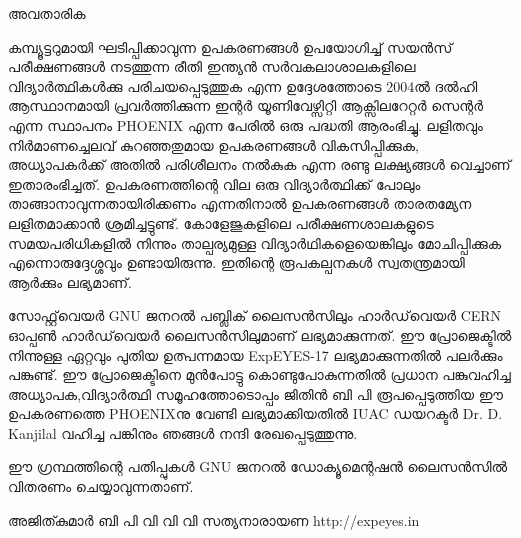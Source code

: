 \documentclass[12pt,a4paper]{report}
\begin{document}
\thispagestyle{empty}


അവതാരിക 

കമ്പ്യൂട്ടറുമായി ഘടിപ്പിക്കാവുന്ന ഉപകരണങ്ങൾ ഉപയോഗിച്ച് സയൻസ് പരീക്ഷണങ്ങൾ നടത്തുന്ന രീതി ഇന്ത്യൻ സർവകലാശാലകളിലെ വിദ്യാർത്ഥികൾക്കു പരിചയപ്പെടുത്തുക എന്ന ഉദ്ദേശത്തോടെ 2004ൽ ദൽഹി ആസ്ഥാനമായി പ്രവർത്തിക്കുന്ന ഇന്റർ യൂണിവേഴ്സിറ്റി ആക്സിലറേറ്റർ സെന്റർ എന്ന സ്ഥാപനം PHOENIX എന്ന പേരിൽ ഒരു പദ്ധതി ആരംഭിച്ചു.  ലളിതവും നിർമാണച്ചെലവ് കുറഞ്ഞതുമായ ഉപകരണങ്ങൾ വികസിപ്പിക്കുക, അധ്യാപകർക്ക് അതിൽ പരിശീലനം നൽകുക എന്ന രണ്ടു ലക്ഷ്യങ്ങൾ വെച്ചാണ് ഇതാരംഭിച്ചത്. ഉപകരണത്തിന്റെ വില ഒരു വിദ്യാർത്ഥിക്ക് പോലും താങ്ങാനാവുന്നതായിരിക്കണം എന്നതിനാൽ ഉപകരണങ്ങൾ താരതമ്യേന ലളിതമാക്കാൻ ശ്രമിച്ചട്ടുണ്ട്. കോളേജുകളിലെ പരീക്ഷണശാലകളുടെ സമയപരിധികളിൽ നിന്നും താല്പര്യമുള്ള വിദ്യാർഥികളെയെങ്കിലും മോചിപ്പിക്കുക എന്നൊരുദ്ദേശ്ശവും ഉണ്ടായിരുന്നു. ഇതിന്റെ രൂപകല്പനകൾ സ്വതന്ത്രമായി ആർക്കും ലഭ്യമാണ്.

സോഫ്റ്റ്‌വെയർ GNU ജനറൽ പബ്ലിക് ലൈസൻസിലും ഹാർഡ്‌വെയർ  CERN ഓപ്പൺ ഹാർഡ്‌വെയർ ലൈസൻസിലുമാണ് ലഭ്യമാക്കുന്നത്. ഈ പ്രോജെക്ടിൽ നിന്നുള്ള ഏറ്റവും പുതിയ ഉത്പന്നമായ ExpEYES-17 ലഭ്യമാക്കുന്നതിൽ പലർക്കും പങ്കുണ്ട്. ഈ പ്രോജെക്ടിനെ മുൻപോട്ടു കൊണ്ടുപോകുന്നതിൽ പ്രധാന പങ്കുവഹിച്ച അധ്യാപക,വിദ്യാർത്ഥി സമൂഹത്തോടൊപ്പം  ജിതിൻ ബി പി രൂപപ്പെടുത്തിയ ഈ ഉപകരണത്തെ PHOENIXനു വേണ്ടി ലഭ്യമാക്കിയതിൽ  IUAC ഡയറക്ടർ Dr. D. Kanjilal വഹിച്ച പങ്കിനും  ഞങ്ങൾ നന്ദി രേഖപ്പെടുത്തുന്നു.

ഈ ഗ്രന്ഥത്തിന്റെ പതിപ്പുകൾ GNU ജനറൽ ഡോക്യൂമെന്റഷൻ ലൈസൻസിൽ വിതരണം ചെയ്യാവുന്നതാണ്.

അജിത്കുമാർ ബി പി 
വി വി വി സത്യനാരായണ 
http://expeyes.in
\end{document}

